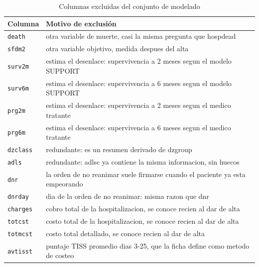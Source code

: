 \begin{table}[H]
\centering
\caption{Columnas excluidas del conjunto de modelado}
\label{tab:exclusiones}
\small
\begin{tabular}{p{2.2cm} p{8.5cm}}
\toprule
\textbf{Columna} & \textbf{Motivo de exclusión} \\
\midrule
\texttt{death} & otra variable de muerte, casi la misma pregunta que hospdead \\
\texttt{sfdm2} & otra variable objetivo, medida despues del alta \\
\texttt{surv2m} & estima el desenlace: supervivencia a 2 meses segun el modelo SUPPORT \\
\texttt{surv6m} & estima el desenlace: supervivencia a 6 meses segun el modelo SUPPORT \\
\texttt{prg2m} & estima el desenlace: supervivencia a 2 meses segun el medico tratante \\
\texttt{prg6m} & estima el desenlace: supervivencia a 6 meses segun el medico tratante \\
\texttt{dzclass} & redundante: es un resumen derivado de dzgroup \\
\texttt{adls} & redundante: adlsc ya contiene la misma informacion, sin huecos \\
\texttt{dnr} & la orden de no reanimar suele firmarse cuando el paciente ya esta empeorando \\
\texttt{dnrday} & dia de la orden de no reanimar: misma razon que dnr \\
\texttt{charges} & cobro total de la hospitalizacion, se conoce recien al dar de alta \\
\texttt{totcst} & costo total de la hospitalizacion, se conoce recien al dar de alta \\
\texttt{totmcst} & costo total detallado, se conoce recien al dar de alta \\
\texttt{avtisst} & puntaje TISS promedio dias 3-25, que la ficha define como metodo de costeo \\
\bottomrule
\end{tabular}
\end{table}
